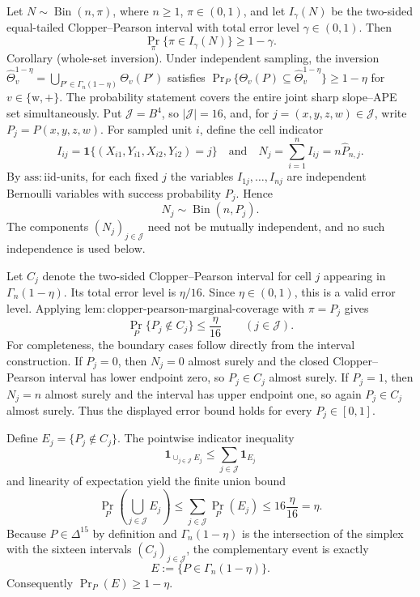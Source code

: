 Let \(N\sim\operatorname{Bin}(n,\pi)\), where \(n\geq 1\), \(\pi\in(0,1)\), and let \(I_{\gamma}(N)\) be the two-sided equal-tailed Clopper--Pearson interval with total error level \(\gamma\in(0,1)\). Then
\[
 \Pr_{\pi}\{\pi\in I_{\gamma}(N)\}\geq 1-\gamma.
\]
Corollary (whole-set inversion). Under independent sampling, the inversion \(\widehat\Theta_v^{1-\eta}=\bigcup_{P'\in\Gamma_n(1-\eta)}\Theta_v(P')\) satisfies \(\Pr_P\{\Theta_v(P)\subseteq\widehat\Theta_v^{1-\eta}\}\ge1-\eta\) for \(v\in\{\mathrm w,+\}\). The probability statement covers the entire joint sharp slope--APE set simultaneously.
Put \(\mathcal J=B^4\), so \(|\mathcal J|=16\), and, for \(j=(x,y,z,w)\in\mathcal J\), write \(P_j=P(x,y,z,w)\).  For sampled unit \(i\), define the cell indicator
\[
 I_{ij}=\mathbf 1\{(X_{i1},Y_{i1},X_{i2},Y_{i2})=j\}
\quad\text{and}\quad
 N_j=\sum_{i=1}^n I_{ij}=n\widehat P_{n,j}.
\]
By \(\mathrm{ass{:}iid\text{-}units}\), for each fixed \(j\) the variables \(I_{1j},\ldots,I_{nj}\) are independent Bernoulli variables with success probability \(P_j\).  Hence
\[
 N_j\sim\operatorname{Bin}(n,P_j).
\]
The components \((N_j)_{j\in\mathcal J}\) need not be mutually independent, and no such independence is used below.

Let \(C_j\) denote the two-sided Clopper--Pearson interval for cell \(j\) appearing in \(\Gamma_n(1-\eta)\).  Its total error level is \(\eta/16\).  Since \(\eta\in(0,1)\), this is a valid error level.  Applying \(\mathrm{lem{:}clopper\text{-}pearson\text{-}marginal\text{-}coverage}\) with \(\pi=P_j\) gives
\[
 \Pr_P\{P_j\notin C_j\}\leq \frac{\eta}{16}
 \qquad(j\in\mathcal J).
\]
For completeness, the boundary cases follow directly from the interval construction.  If \(P_j=0\), then \(N_j=0\) almost surely and the closed Clopper--Pearson interval has lower endpoint zero, so \(P_j\in C_j\) almost surely.  If \(P_j=1\), then \(N_j=n\) almost surely and the interval has upper endpoint one, so again \(P_j\in C_j\) almost surely.  Thus the displayed error bound holds for every \(P_j\in[0,1]\).

Define \(E_j=\{P_j\notin C_j\}\).  The pointwise indicator inequality
\[
 \mathbf 1_{\cup_{j\in\mathcal J}E_j}
 \leq
 \sum_{j\in\mathcal J}\mathbf 1_{E_j}
\]
and linearity of expectation yield the finite union bound
\[
 \Pr_P\!\left(\bigcup_{j\in\mathcal J}E_j\right)
 \leq
 \sum_{j\in\mathcal J}\Pr_P(E_j)
 \leq
 16\frac{\eta}{16}=\eta.
\]
Because \(P\in\Delta^{15}\) by definition and \(\Gamma_n(1-\eta)\) is the intersection of the simplex with the sixteen intervals \((C_j)_{j\in\mathcal J}\), the complementary event is exactly
\[
 E:=\{P\in\Gamma_n(1-\eta)\}.
\]
Consequently \(\Pr_P(E)\geq1-\eta\).

